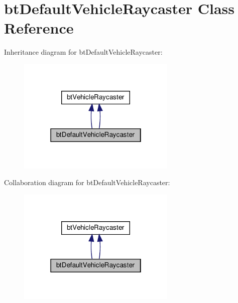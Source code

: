 \hypertarget{classbtDefaultVehicleRaycaster}{}\section{bt\+Default\+Vehicle\+Raycaster Class Reference}
\label{classbtDefaultVehicleRaycaster}


Inheritance diagram for bt\+Default\+Vehicle\+Raycaster\+:
\nopagebreak
\begin{figure}[H]
\begin{center}
\leavevmode
\includegraphics[width=214pt]{classbtDefaultVehicleRaycaster__inherit__graph}
\end{center}
\end{figure}


Collaboration diagram for bt\+Default\+Vehicle\+Raycaster\+:
\nopagebreak
\begin{figure}[H]
\begin{center}
\leavevmode
\includegraphics[width=214pt]{classbtDefaultVehicleRaycaster__coll__graph}
\end{center}
\end{figure}
